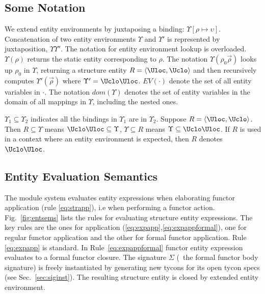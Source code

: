 \documentclass[9pt,nocopyrightspace, fleqn]{sigplanconf}
\begin{document}
\subsection{Some Notation}\label{sec:entitycalc-notation}
We extend entity environments by juxtaposing a binding:
$\Upsilon[\rho\mapsto\upsilon]$.
Concatenation of two entity environments $\Upsilon$ and $\Upsilon'$ is represented by
juxtaposition, $\Upsilon\Upsilon'$. The notation for entity
environment lookup is overloaded. $\Upsilon(\rho)$ returns the static
entity corresponding to $\rho$. The notation
$\Upsilon(\rho_0\vec{\rho})$ looks up $\rho_0$ in $\Upsilon$,
returning a structure entity $R=\langle \Uloc,\Uclo \rangle$ and then recursively
computes $\Upsilon'(\vec{\rho})$ where $\Upsilon' =
\Uclo\Uloc$. $EV(\cdot)$ denote the set of all entity variables in
$\cdot$. The notation $dom(\Upsilon)$ denotes the set of entity
variables in the domain of all mappings in $\Upsilon$, including the
nested ones.

$\Upsilon_1 \subseteq \Upsilon_2$ indicates all the bindings in
$\Upsilon_1$ are in $\Upsilon_2$. Suppose $R=\langle \Uloc,
\Uclo \rangle$.  Then $R \subseteq \Upsilon$
means $\Uclo\Uloc\subseteq \Upsilon$,  
$\Upsilon\subseteq R$ means $\Upsilon
\subseteq \Uclo\Uloc$. If $R$ is used in a
context where an entity environment is expected, then $R$ denotes
$\Uclo\Uloc$.

\subsection{Entity Evaluation Semantics}


The module system evaluates entity expressions when elaborating
functor application (rule \ref{eq:strapp}), i.e when performing a
functor action.
Fig.~\ref{fig:entsems} lists the rules for evaluating structure entity
expressions. The key rules are the ones for application
(\ref{eq:expapp},\ref{eq:expappformal}), one for regular functor application
and the other for formal functor application. Rule \ref{eq:expapp} is
standard. In Rule~\ref{eq:expappformal} functor entity
expression evaluates to a formal functor closure.
The signature $\Sigma$ (\ie~the formal functor body
signature) is freely instantiated by generating new tycons for its
open tycon specs (see Sec.~\ref{sec:siginst}). The resulting structure entity
is closed by extended entity environment.
\end{document}
